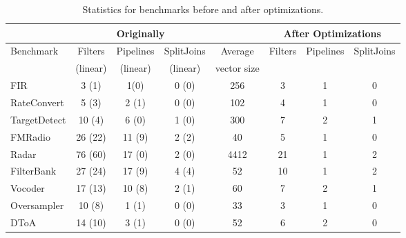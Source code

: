\begin{table*}[t]
\vspace{-6pt}
\centering
\small
\begin{tabular}{|l|c|c|c||c||c|c|c|} 
\hline
& \multicolumn{3}{|c||}{Originally}  &             & \multicolumn{3}{|c|}{After Optimizations} \\
\hline
Benchmark  & Filters & Pipelines& SplitJoins & Average     & Filters      & Pipelines         & SplitJoins \\
           & (linear)& (linear) & (linear)   & vector size &              &                   &            \\
\hline
FIR        & 3 (1)   & 1(0)     & 0 (0)      & 256         & 3            & 1                 & 0 \\
\hline
RateConvert& 5 (3)   & 2 (1)    & 0 (0)      & 102         & 4            & 1                 & 0 \\
\hline
TargetDetect& 10 (4) & 6 (0)    & 1 (0)      & 300         & 7            & 2                 & 1 \\
\hline
FMRadio    & 26 (22) & 11 (9)   & 2 (2)      & 40          & 5            & 1                 & 0 \\
\hline
Radar      & 76 (60) & 17 (0)   & 2 (0)      & 4412        & 21           & 1                 & 2 \\
\hline
FilterBank & 27 (24) & 17 (9)   & 4 (4)      & 52          & 10           & 1                 & 2 \\
\hline
Vocoder    & 17 (13) & 10 (8)   & 2 (1)      & 60          & 7            & 2                 & 1 \\
\hline
Oversampler& 10 (8) & 1 (1)     & 0 (0)      & 33          & 3            & 1                 & 0 \\
\hline
DToA       & 14 (10) & 3 (1)    & 0 (0)      & 52          & 6            & 2                 & 0 \\
\hline

\end{tabular}
\vspace{-3pt}
\caption{Statistics for benchmarks before and after optimizations.
\protect\label{fig:benchmark-statistics}}
\vspace{-4pt}
\end{table*}
